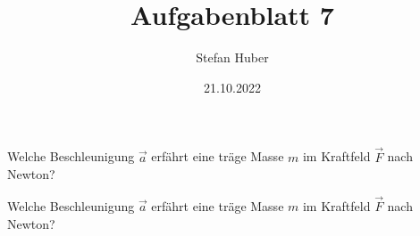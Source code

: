 \documentclass[ngerman]{exsheet2}
\title{Aufgabenblatt 7}
\date{21.10.2022}
\author{Stefan Huber}
\institute{Department IT}
\begin{document}
\maketitle

\begin{exercise}
  Welche Beschleunigung $\vec{a}$ erfährt eine träge Masse $m$ im Kraftfeld
  $\vec{F}$ nach Newton?
  \vspace{2cm}
\end{exercise}

\begin{exercise}
  Welche Beschleunigung $\vec{a}$ erfährt eine träge Masse $m$ im Kraftfeld
  $\vec{F}$ nach Newton?
  \vspace{2cm}
\end{exercise}
\end{document}
